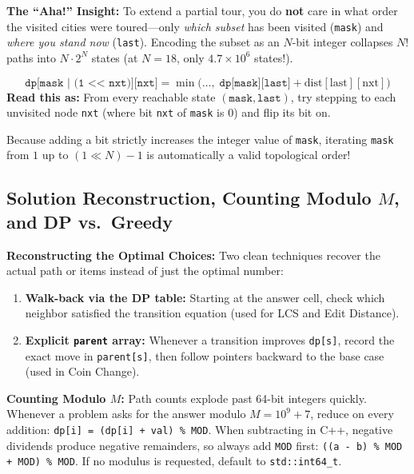 \documentclass[11pt,a4paper]{article}
\theoremstyle{definition}
\newcommand{\ahabeat}{\textbf{\color{accentteal}The ``Aha!'' Insight:} }
\begin{document}
\ahabeat To extend a partial tour, you do \textbf{not} care in what order the visited cities were toured---only \emph{which subset} has been visited (\texttt{mask}) and \emph{where you stand now} (\texttt{last}). Encoding the subset as an $N$-bit integer collapses $N!$ paths into $N \cdot 2^N$ states (at $N = 18$, only $4.7 \times 10^6$ states!).

\begin{formulabox}
$$\texttt{dp[mask | (1 << nxt)][nxt]} = \min\big(\dots,\; \texttt{dp[mask][last]} + \text{dist}[\text{last}][\text{nxt}]\big)$$
\textbf{Read this as:} From every reachable state $(\texttt{mask}, \texttt{last})$, try stepping to each unvisited node \texttt{nxt} (where bit \texttt{nxt} of \texttt{mask} is $0$) and flip its bit on.
\end{formulabox}

Because adding a bit strictly increases the integer value of \texttt{mask}, iterating \texttt{mask} from $1$ up to $(1 \ll N) - 1$ is automatically a valid topological order!

\subsection{Solution Reconstruction, Counting Modulo \texorpdfstring{$M$}{M}, and DP vs.\ Greedy}

\textbf{Reconstructing the Optimal Choices:} Two clean techniques recover the actual path or items instead of just the optimal number:
\begin{enumerate}
    \item \textbf{Walk-back via the DP table:} Starting at the answer cell, check which neighbor satisfied the transition equation (used for LCS and Edit Distance).
    \item \textbf{Explicit \texttt{parent} array:} Whenever a transition improves \texttt{dp[s]}, record the exact move in \texttt{parent[s]}, then follow pointers backward to the base case (used in Coin Change).
\end{enumerate}

\textbf{Counting Modulo $M$:} Path counts explode past 64-bit integers quickly. Whenever a problem asks for the answer modulo $M = 10^9 + 7$, reduce on every addition: \texttt{dp[i] = (dp[i] + val) \% MOD}. When subtracting in C++, negative dividends produce negative remainders, so always add \texttt{MOD} first: \texttt{((a - b) \% MOD + MOD) \% MOD}. If no modulus is requested, default to \texttt{std::int64\_t}.
\end{document}
